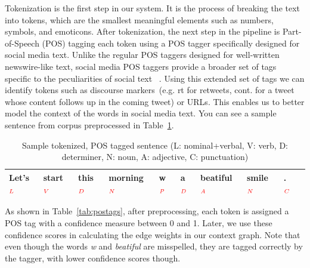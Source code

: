 \documentclass[a4paper,onesided,12pt]{report}
\begin{document}
Tokenization is the first step in our system. It is the process of breaking the text into tokens, which are the smallest meaningful elements such as numbers, symbols, and emoticons. After tokenization, the next step in the pipeline is Part-of-Speech (POS) tagging each token using a POS tagger specifically designed for social media text. Unlike the regular POS taggers designed for well-written newswire-like text, social media POS taggers provide a broader set of tags specific to the peculiarities of social text ~\cite{owoputi2013improved,Gimpel:2011:PTT:2002736.2002747}. Using this extended set of tags we can identify tokens such as discourse markers~(e.g. rt for retweets, cont. for a tweet whose content follows up in the coming tweet) or URLs. This enables us to better model the context of the words in social media text. You can see a sample sentence from corpus preprocessed in Table~\ref{tab:postagged}.

\begin{table}[tbhp]
\caption{Sample tokenized, POS tagged sentence (L: nominal+verbal, V: verb, D: determiner, N: noun, A: adjective, C: punctuation)}
\centering
\begin{tabular}{|l|l|l|l|l|l|l|l|l|l|}
\hline
Let's$_{\textcolor{red}{L}}$ & start$_{\textcolor{red}V}$ & this$_{\textcolor{red}D}$ & morning$_{\textcolor{red}N}$ & w$_{\textcolor{red}P}$ & a$_{\textcolor{red}D}$ & beatiful$_{\textcolor{red}A}$ & smile$_{\textcolor{red}N}$ & .$_{\textcolor{red}C}$\\
\hline
\end{tabular}
\label{tab:postagged}
\end{table}


As shown in Table~\ref{tab:postags}, after preprocessing, each token is assigned a POS tag with a confidence measure between 0 and 1. Later, we use these confidence scores in calculating the edge weights in our context graph. Note that even though the words \emph{w} and\emph{ beatiful} are misspelled, they are tagged correctly by the tagger, with lower confidence scores though.
\end{document}
